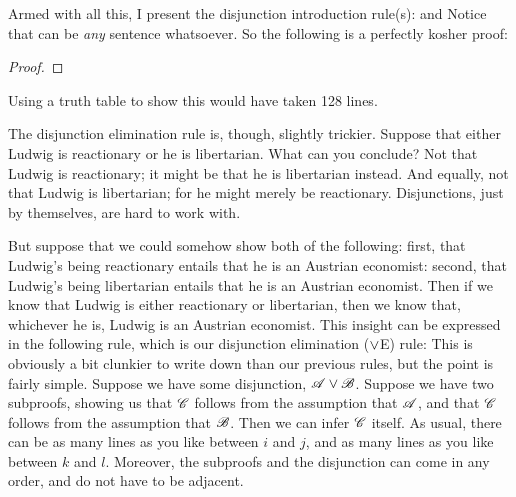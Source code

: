 Armed with all this, I present the disjunction introduction rule(s):
and
Notice that  can be \emph{any} sentence whatsoever. So the following is a perfectly kosher proof:
\begin{proof}
\end{proof}
Using a truth table to show this would have taken 128 lines.

The disjunction elimination rule is, though, slightly trickier. Suppose that either Ludwig is reactionary or he is libertarian. What can you conclude? Not that Ludwig is reactionary; it might be that he is libertarian instead. And equally, not that Ludwig is libertarian; for he might merely be reactionary. Disjunctions, just by themselves, are hard to work with. 

But suppose that we could somehow show both of the following: first, that Ludwig's being reactionary entails that he is an Austrian economist: second, that Ludwig's being libertarian entails that he is an Austrian economist. Then if we know that Ludwig is either reactionary or libertarian, then we know that, whichever he is, Ludwig is an Austrian economist. This insight can be expressed in the following rule, which is our disjunction elimination ($\vee$E) rule:
This is obviously a bit clunkier to write down than our previous rules, but the point is fairly simple. Suppose we have some disjunction, $\mathscr{A} \vee \mathscr{B}$. Suppose we have two subproofs, showing us that $\mathscr{C}$ follows from the assumption that $\mathscr{A}$, and that $\mathscr{C}$ follows from the assumption that $\mathscr{B}$. Then we can infer $\mathscr{C}$ itself. As usual, there can be as many lines as you like between $i$ and $j$, and as many lines as you like between $k$ and $l$. Moreover, the subproofs and the disjunction can come in any order, and do not have to be adjacent.


